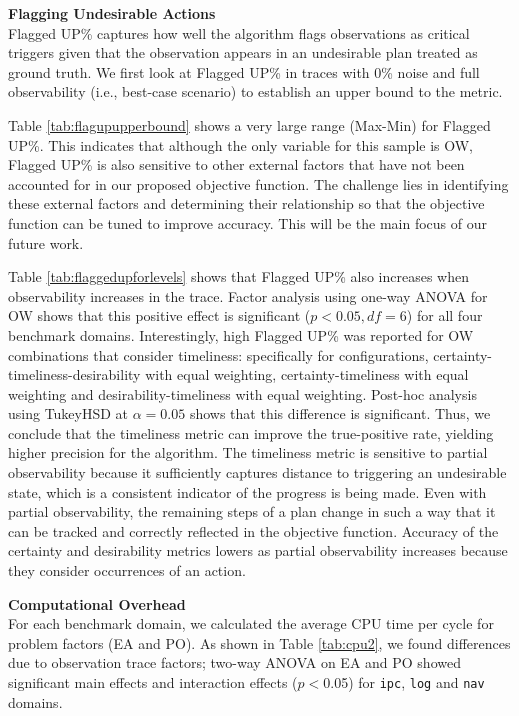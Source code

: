 \textbf{Flagging Undesirable Actions}\\
Flagged UP\% captures how well the algorithm flags observations as critical triggers given that the observation appears in an undesirable plan treated as ground truth. We first look at Flagged UP\% in traces with 0\% noise and full observability (i.e., best-case scenario) to establish an upper bound to the metric.

Table \ref{tab:flagupupperbound} shows a very large range (Max-Min) for Flagged UP\%. This indicates that although the only variable for this sample is OW, Flagged UP\% is also sensitive to other external factors that have not been accounted for in our proposed objective function. The challenge lies in identifying these external factors and determining their relationship so that the objective function can be tuned to improve accuracy. This will be the main focus of our future work. 

Table \ref{tab:flaggedupforlevels} shows that Flagged UP\% also increases when observability increases in the trace. Factor analysis using one-way ANOVA for OW shows that this positive effect is significant ($p<0.05, df=6$) for all four benchmark domains. Interestingly, high Flagged UP\% was reported for OW combinations that consider timeliness: specifically for configurations, certainty-timeliness-desirability with equal weighting, certainty-timeliness with equal weighting and desirability-timeliness with equal weighting. Post-hoc analysis using TukeyHSD at $\alpha=0.05$ shows that this difference is significant. Thus, we conclude that the timeliness metric can improve the true-positive rate, yielding higher precision for the algorithm. The timeliness metric is sensitive to partial observability because it sufficiently captures distance to triggering an undesirable state, which is a consistent indicator of the progress is being made. Even with partial observability, the remaining steps of a plan change in such a way that it can be tracked and correctly reflected in the objective function. Accuracy of the certainty and desirability metrics lowers as partial observability increases because they consider occurrences of an action. 


\textbf{Computational Overhead}\\
For each benchmark domain, we calculated the average CPU time per cycle for problem factors (EA and PO). As shown in Table \ref{tab:cpu2}, we found differences due to observation trace factors; two-way ANOVA on EA and PO showed significant main effects and interaction effects ($p<$0.05) for \texttt{ipc}, \texttt{log} and \texttt{nav} domains.


